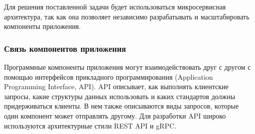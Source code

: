 Для решения поставленной задачи будет использоваться микросервисная архитектура, так как она позволяет независимо разрабатывать и масштабировать компоненты приложения. 



\subsubsection{Связь компонентов приложения}

%
%
%
%



Программные компоненты приложения могут взаимодействовать друг с другом с помощью интерфейсов прикладного программирования (Application Programming Interface, API). %
API описывает, как выполнять клиентские запросы, какие структуры данных использовать и каких стандартов должны придерживаться клиенты. В нем также описываются виды запросов, которые один компонент может отправлять другому. Для разработки API широко используются архитектурные стили REST API и gRPC.



